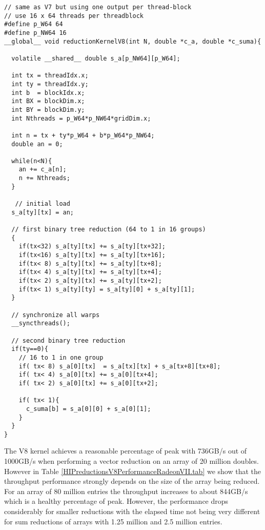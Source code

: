 \begin{verbatim}
// same as V7 but using one output per thread-block  
// use 16 x 64 threads per threadblock 
#define p_W64 64
#define p_NW64 16
__global__ void reductionKernelV8(int N, double *c_a, double *c_suma){

  volatile __shared__ double s_a[p_NW64][p_W64];

  int tx = threadIdx.x;
  int ty = threadIdx.y;
  int b  = blockIdx.x;
  int BX = blockDim.x;
  int BY = blockDim.y;
  int Nthreads = p_W64*p_NW64*gridDim.x;

  int n = tx + ty*p_W64 + b*p_W64*p_NW64;
  double an = 0;

  while(n<N){
    an += c_a[n];
    n += Nthreads;
  }
 
   // initial load                                 
  s_a[ty][tx] = an;

  // first binary tree reduction (64 to 1 in 16 groups)
  {
    if(tx<32) s_a[ty][tx] += s_a[ty][tx+32];
    if(tx<16) s_a[ty][tx] += s_a[ty][tx+16];
    if(tx< 8) s_a[ty][tx] += s_a[ty][tx+8];
    if(tx< 4) s_a[ty][tx] += s_a[ty][tx+4];
    if(tx< 2) s_a[ty][tx] += s_a[ty][tx+2];
    if(tx< 1) s_a[ty][ty] = s_a[ty][0] + s_a[ty][1];
  }

  // synchronize all warps                     
  __syncthreads();

  // second binary tree reduction                    
  if(ty==0){
    // 16 to 1 in one group      
    if( tx< 8) s_a[0][tx]  = s_a[tx][tx] + s_a[tx+8][tx+8];
    if( tx< 4) s_a[0][tx] += s_a[0][tx+4];
    if( tx< 2) s_a[0][tx] += s_a[0][tx+2];

    if( tx< 1){
      c_suma[b] = s_a[0][0] + s_a[0][1];
    }
  }
}
\end{verbatim}
The V8 kernel achieves a reasonable percentage of peak with 736GB/s out of 1000GB/s when performing a vector reduction on an array of 20 million doubles. However in Table \ref{HIPreductionsV8PerformanceRadeonVII.tab} we show that the throughput performance strongly depends on the size of the array being reduced. For an array of 80 million entries the throughput increases to about 844GB/s which is a healthy percentage of peak. However, the performance drops considerably for smaller reductions with the elapsed time not being very different for sum reductions of arrays with 1.25 million and 2.5 million entries.
